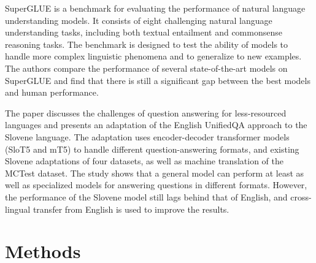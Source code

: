 \documentclass[fleqn,moreauthors,10pt]{ds_report}
\begin{document}
SuperGLUE \cite{wang2019superglue} is a benchmark for evaluating the performance of natural language understanding models. It consists of eight challenging natural language understanding tasks, including both textual entailment and commonsense reasoning tasks. The benchmark is designed to test the ability of models to handle more complex linguistic phenomena and to generalize to new examples. The authors compare the performance of several state-of-the-art models on SuperGLUE and find that there is still a significant gap between the best models and human performance.

The paper \cite{logar2022unified} discusses the challenges of question answering for less-resourced languages and presents an adaptation of the English UnifiedQA approach to the Slovene language. The adaptation uses encoder-decoder transformer models (SloT5 and mT5) to handle different question-answering formats, and existing Slovene adaptations of four datasets, as well as machine translation of the MCTest dataset. The study shows that a general model can perform at least as well as specialized models for answering questions in different formats. However, the performance of the Slovene model still lags behind that of English, and cross-lingual transfer from English is used to improve the results.

\section*{Methods}





\end{document}

